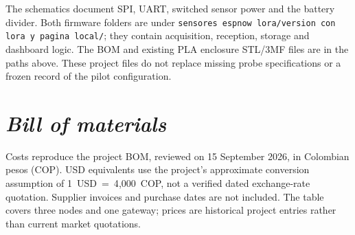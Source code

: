 \documentclass[11pt, letterpaper]{article}
\begin{document}
\vskip 0.3cm
The schematics document SPI, UART, switched sensor power and the battery divider. Both firmware folders are under \texttt{sensores espnow lora/version con lora y pagina local/}; they contain acquisition, reception, storage and dashboard logic. The BOM and existing PLA enclosure STL/3MF files are in the paths above. These project files do not replace missing probe specifications or a frozen record of the pilot configuration.

\section*{\textit{Bill of materials}}

Costs reproduce the project BOM, reviewed on 15 September 2026, in Colombian pesos (COP). USD equivalents use the project's approximate conversion assumption of 1~USD~=~4{,}000~COP, not a verified dated exchange-rate quotation. Supplier invoices and purchase dates are not included. The table covers three nodes and one gateway; prices are historical project entries rather than current market quotations.
\end{document}
